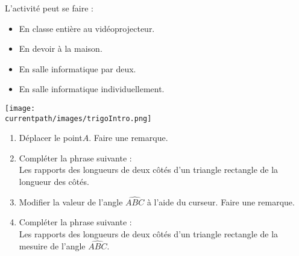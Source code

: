 \begin{changemargin}{-10mm}{-10mm}
\begin{activite}
    \begin{minipage}{0.6\linewidth}
        \begin{remarque}
            L'activité peut se faire :
            \begin{itemize}
                \item En classe entière au vidéoprojecteur.
                \item En devoir à la maison.
                \item En salle informatique par deux.
                \item En salle informatique individuellement.
            \end{itemize}
        \end{remarque}
    \end{minipage}
    \begin{minipage}{0.35\linewidth}
        \begin{center}
            \texttt{[image: \\currentpath/images/trigoIntro.png]}
        \end{center}
    \end{minipage}
    \begin{center}
        {\Huge {}}    
        
    \end{center}
    \begin{enumerate}
        \item Déplacer le point$A$. Faire une remarque.
        \par\medskip
        \pointilles\par\medskip
        \pointilles\par\medskip
        \pointilles\par\medskip
        \pointilles
        \item Compléter la phrase suivante :\\
        Les rapports des longueurs de deux côtés d'un triangle rectangle \pointilles[0.3\linewidth] de la longueur des côtés.
        \item Modifier la valeur de l'angle $\widehat{ABC}$ à l'aide du curseur. Faire une remarque.
        \par\medskip
        \pointilles\par\medskip
        \pointilles\par\medskip
        \pointilles\par\medskip
        \pointilles\par\medskip        
        \item Compléter la phrase suivante :\\
        Les rapports des longueurs de deux côtés d'un triangle rectangle \pointilles[0.3\linewidth] de la mesuire de l'angle $\widehat{ABC}$.
    \end{enumerate}


\end{activite}
\end{changemargin}
